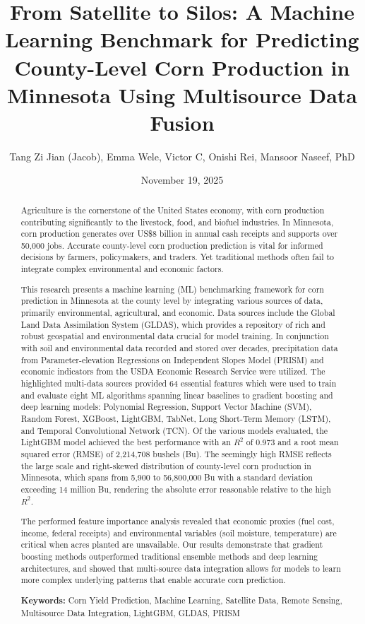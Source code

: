 \documentclass[twocolumn]{article}
\title{From Satellite to Silos: A Machine Learning Benchmark for Predicting County-Level Corn Production in Minnesota Using Multisource Data Fusion}
\author{Tang Zi Jian (Jacob), Emma Wele, Victor C, Onishi Rei, Mansoor Naseef, PhD}
\date{November 19, 2025}
\begin{document}
\maketitle

\begin{abstract}
Agriculture is the cornerstone of the United States economy, with corn production contributing significantly to the livestock, food, and biofuel industries. In Minnesota, corn production generates over US\$8 billion in annual cash receipts and supports over 50,000 jobs. Accurate county-level corn production prediction is vital for informed decisions by farmers, policymakers, and traders. Yet traditional methods often fail to integrate complex environmental and economic factors.

This research presents a machine learning (ML) benchmarking framework for corn prediction in Minnesota at the county level by integrating various sources of data, primarily environmental, agricultural, and economic. Data sources include the Global Land Data Assimilation System (GLDAS), which provides a repository of rich and robust geospatial and environmental data crucial for model training. In conjunction with soil and environmental data recorded and stored over decades, precipitation data from Parameter-elevation Regressions on Independent Slopes Model (PRISM) and economic indicators from the USDA Economic Research Service were utilized. The highlighted multi-data sources provided 64 essential features which were used to train and evaluate eight ML algorithms spanning linear baselines to gradient boosting and deep learning models: Polynomial Regression, Support Vector Machine (SVM), Random Forest, XGBoost, LightGBM, TabNet, Long Short-Term Memory (LSTM), and Temporal Convolutional Network (TCN). Of the various models evaluated, the LightGBM model achieved the best performance with an $R^2$ of 0.973 and a root mean squared error (RMSE) of 2,214,708 bushels (Bu). The seemingly high RMSE reflects the large scale and right-skewed distribution of county-level corn production in Minnesota, which spans from 5,900 to 56,800,000 Bu with a standard deviation exceeding 14 million Bu, rendering the absolute error reasonable relative to the high $R^2$.

The performed feature importance analysis revealed that economic proxies (fuel cost, income, federal receipts) and environmental variables (soil moisture, temperature) are critical when acres planted are unavailable. Our results demonstrate that gradient boosting methods outperformed traditional ensemble methods and deep learning architectures, and showed that multi-source data integration allows for models to learn more complex underlying patterns that enable accurate corn prediction.

\textbf{Keywords:} Corn Yield Prediction, Machine Learning, Satellite Data, Remote Sensing, Multisource Data Integration, LightGBM, GLDAS, PRISM
\end{abstract}
\end{document}
